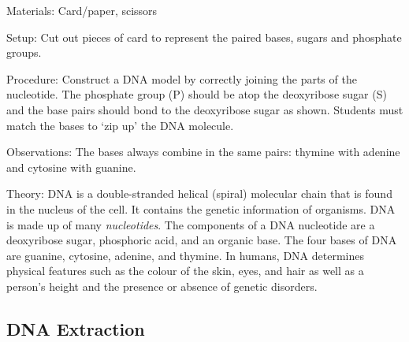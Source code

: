 \begin{multicols}{2}
\begin{description*}
\item[Materials:]{Card/paper, scissors}
\item[Setup:]{Cut out pieces of card to
represent the paired bases, sugars and phosphate groups.}
\item[Procedure:]{Construct a DNA model by correctly joining the parts of the nucleotide. The phosphate group (P) should be atop the deoxyribose sugar (S) and the
base pairs should bond to the deoxyribose sugar as shown. Students must match the bases to
`zip up' the DNA molecule.}
\item[Observations:]{The bases
always combine in the same pairs:
thymine with adenine and
cytosine with guanine.}
\item[Theory:]{DNA is a double-stranded helical (spiral) molecular chain that is found in the nucleus of the cell. It contains the genetic information of organisms. DNA is made up of many \emph{nucleotides}. The components of a DNA nucleotide are a deoxyribose sugar, phosphoric acid, and an organic base. The four bases of DNA are guanine, cytosine, adenine, and thymine. In humans, DNA determines physical features such as the colour of the skin, eyes, and hair as well as a person's height and the presence or absence of genetic disorders.}
\end{description*}

\subsection{DNA Extraction} %



\end{multicols}

